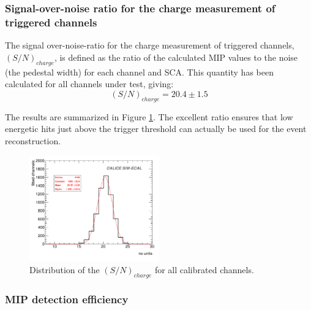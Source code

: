 \documentclass[final,3p,times,twocolumn]{elsarticle}
\begin{document}
\subsubsection{Signal-over-noise ratio for the charge measurement of triggered channels}
\label{sec:sn}

The signal over-noise-ratio for the charge measurement of triggered channels, $(S/N)_{charge}$, is defined 
as the ratio of the calculated MIP values to the noise (the pedestal width) for each channel and SCA.
This quantity has been calculated for all channels under test, giving:
\begin{equation}
(S/N)_{charge}=20.4\pm1.5
\end{equation}

The results are summarized in Figure \ref{mipandSN}.
The excellent ratio ensures that low energetic hits just above the trigger threshold can actually be used for the event reconstruction.

\begin{figure}[h!t]
  \centering
  \includegraphics[width=0.5\textwidth]{SN_summary-eps-converted-to.pdf}  
\caption{Distribution of the $(S/N)_{charge}$ for all calibrated channels.}
\label{mipandSN}
\end{figure}

\subsubsection{MIP detection efficiency}
\label{sec:mip}
\end{document}
